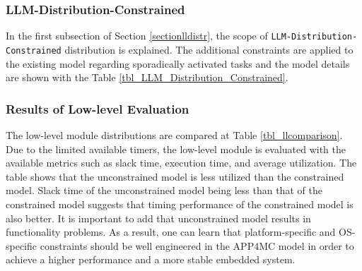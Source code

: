 \llmdistrUnconstrained

\subsubsection{LLM-Distribution-Constrained}
In the first subsection of Section \ref{sectionlldistr}, the scope of \texttt{LLM-Distribution-Constrained} distribution is explained. The additional constraints are applied to the existing model regarding sporadically activated tasks and the model details are shown with the Table \ref{tbl_LLM_Distribution_Constrained}. 

\llmdistrConstrained

\subsubsection{Results of Low-level Evaluation}
The low-level module distributions are compared at Table \ref{tbl_llcomparison}. Due to the limited available timers, the low-level module is evaluated with the available metrics such as slack time, execution time, and average utilization. The table shows that the unconstrained model is less utilized than the constrained model. Slack time of the unconstrained model being less than that of the constrained model suggests that timing performance of the constrained model is also better. It is important to add that unconstrained model results in functionality problems. As a result, one can learn that platform-specific and OS-specific constraints should be well engineered in the APP4MC model in order to achieve a higher performance and a more stable embedded system. 

\llcomparison




